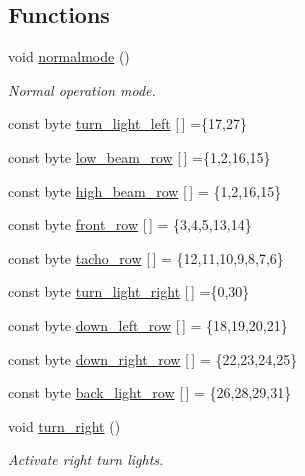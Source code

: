 \subsection*{Functions}
\begin{DoxyCompactItemize}
\item 
void \hyperlink{group__car_gaa0a39b0689218537e29a29f9c3f2af47}{normalmode} ()
\begin{DoxyCompactList}\small\item\em Normal operation mode. \end{DoxyCompactList}\end{DoxyCompactItemize}
\begin{DoxyCompactItemize}
\item 
const byte \hyperlink{group__car_gac03fd0ab9cbcc53730039ad03e9b094d}{turn\+\_\+light\+\_\+left} \mbox{[}$\,$\mbox{]} =\{17,27\}
\item 
const byte \hyperlink{group__car_ga1a25903a2850d9849775664473070489}{low\+\_\+beam\+\_\+row} \mbox{[}$\,$\mbox{]} =\{1,2,16,15\}
\item 
const byte \hyperlink{group__car_ga1ecea646e1c5dcdfc643287a5f2041bb}{high\+\_\+beam\+\_\+row} \mbox{[}$\,$\mbox{]} = \{1,2,16,15\}
\item 
const byte \hyperlink{group__car_ga5009aa0cbe6b32a72b085489b027800e}{front\+\_\+row} \mbox{[}$\,$\mbox{]} = \{3,4,5,13,14\}
\item 
const byte \hyperlink{group__car_ga6ade605406f4c1ce9f03a5a2530f6dbe}{tacho\+\_\+row} \mbox{[}$\,$\mbox{]} = \{12,11,10,9,8,7,6\}
\item 
const byte \hyperlink{group__car_gaa5a6ee27fdf1d7c939cdf2a7266d7e84}{turn\+\_\+light\+\_\+right} \mbox{[}$\,$\mbox{]} =\{0,30\}
\item 
const byte \hyperlink{group__car_gaac36c9836edd3a125668213f0fb72b5a}{down\+\_\+left\+\_\+row} \mbox{[}$\,$\mbox{]} = \{18,19,20,21\}
\item 
const byte \hyperlink{group__car_gadbf10ff9ee353128c568e07c32b1ffa9}{down\+\_\+right\+\_\+row} \mbox{[}$\,$\mbox{]} = \{22,23,24,25\}
\item 
const byte \hyperlink{group__car_ga516415cfaebc59b71f822fb4cf86b22c}{back\+\_\+light\+\_\+row} \mbox{[}$\,$\mbox{]} = \{26,28,29,31\}
\item 
void \hyperlink{group__car_gaca3b725ebee32d3719a9c02b41002ea3}{turn\+\_\+right} ()
\begin{DoxyCompactList}\small\item\em Activate right turn lights. \end{DoxyCompactList}\item 

\end{DoxyCompactItemize}
